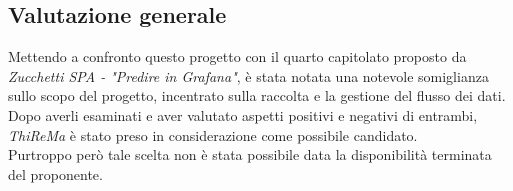 \subsection{Valutazione generale}
Mettendo a confronto questo progetto con il quarto capitolato proposto da \textit{Zucchetti SPA - "Predire in Grafana"}, è stata notata una notevole somiglianza sullo scopo del progetto, incentrato sulla raccolta e la gestione del flusso dei dati.  \\
Dopo averli esaminati e aver valutato aspetti positivi e negativi di entrambi, \textit{ThiReMa} è stato preso in considerazione come possibile candidato. \\
Purtroppo però tale scelta non è stata possibile data la disponibilità terminata del proponente.








